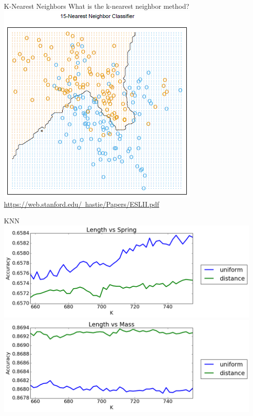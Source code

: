 \documentclass{beamer}
\begin{document}
\begin{frame}{K-Nearest Neighbors}
\centering
What is the k-nearest neighbor method? \\
\vspace{20 pt}
\includegraphics[scale=0.5]{images/KNNExample.png} \\
{\tiny \href{https://web.stanford.edu/~hastie/Papers/ESLII.pdf}{https://web.stanford.edu/~hastie/Papers/ESLII.pdf}}
\end{frame}

\begin{frame}{KNN}
\centering
\vspace{10 pt}
\includegraphics[scale=0.3]{images/KvsAccuracy14.png}\\
\vspace{10 pt}
\includegraphics[scale=0.3]{images/KvsAccuracy13.png}
\end{frame}
\end{document}
